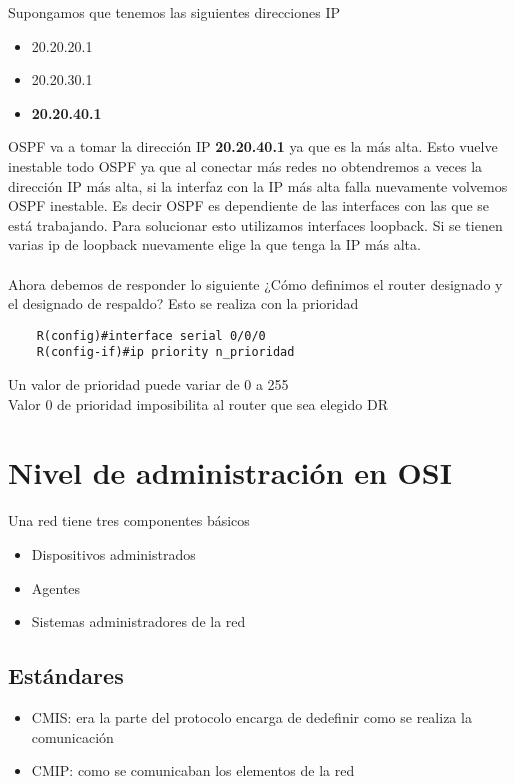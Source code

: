 Supongamos que tenemos las siguientes direcciones IP
\begin{itemize}
    \item 20.20.20.1 
    \item 20.20.30.1
    \item \textbf{20.20.40.1}
\end{itemize}
OSPF va a tomar la dirección IP \textbf{20.20.40.1} ya que es la más alta. Esto vuelve inestable todo OSPF ya que al conectar más redes no obtendremos a veces la dirección IP más alta, si la interfaz con la IP más alta falla nuevamente volvemos OSPF inestable. Es decir OSPF es dependiente de las interfaces con las que se está trabajando. Para solucionar esto utilizamos interfaces loopback.
Si se tienen varias ip de loopback nuevamente elige la que tenga la IP más alta.\\\\

Ahora debemos de responder lo siguiente ¿Cómo definimos el router designado y el designado de respaldo? Esto se realiza con la prioridad 
\begin{lstlisting}
    R(config)#interface serial 0/0/0
    R(config-if)#ip priority n_prioridad
\end{lstlisting}
Un valor de prioridad puede variar de 0 a 255 \\

Valor 0 de prioridad imposibilita al router que sea elegido DR \\

\chapter{Nivel de administración en OSI}
Una red tiene tres componentes básicos
\begin{itemize}
    \item Dispositivos administrados 
    \item Agentes 
    \item Sistemas administradores de la red
\end{itemize}
\section{ Estándares }
\begin{itemize}
    \item {CMIS: era la parte del protocolo encarga de dedefinir como se realiza la comunicación}
    \item {CMIP: como se comunicaban los elementos de la red }
\end{itemize}

